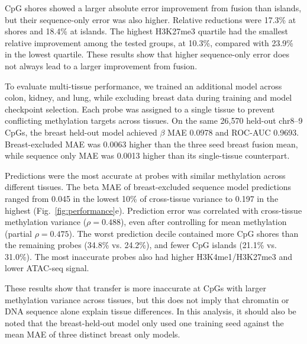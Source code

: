\documentclass[11pt,letterpaper]{article}
\begin{document}
CpG shores showed a larger absolute error improvement from fusion than islands, but their sequence-only error was also higher. Relative reductions were 17.3\% at shores and 18.4\% at islands. The highest H3K27me3 quartile had the smallest relative improvement among the tested groups, at 10.3\%, compared with 23.9\% in the lowest quartile. These results show that higher sequence-only error does not always lead to a larger improvement from fusion. 

To evaluate multi-tissue performance, we trained an additional model across colon, kidney, and lung, while excluding breast data during training and model checkpoint selection. Each probe was assigned to a single tissue to prevent conflicting methylation targets across tissues. On the same 26,570 held-out chr8--9 CpGs, the breast held-out model achieved $\beta$ MAE 0.0978 and ROC-AUC 0.9693. Breast-excluded MAE was 0.0063 higher than the three seed breast fusion mean, while sequence only MAE was 0.0013 higher than its single-tissue counterpart. 

Predictions were the most accurate at probes with similar methylation across different tissues. The beta MAE of breast-excluded sequence model predictions ranged from 0.045 in the lowest 10\% of cross-tissue variance to 0.197 in the highest (Fig.~\ref{fig:performance}e). Prediction error was correlated with cross-tissue methylation variance ($\rho=0.488$), even after controlling for mean methylation (partial $\rho=0.475$). The worst prediction decile contained more CpG shores than the remaining probes (34.8\% vs. 24.2\%), and fewer CpG islands (21.1\% vs. 31.0\%). The most inaccurate probes also had higher H3K4me1/H3K27me3 and lower ATAC-seq signal.

These results show that transfer is more inaccurate at CpGs with larger methylation variance across tissues, but this does not imply that chromatin or DNA sequence alone explain tissue differences. In this analysis, it should also be noted that the breast-held-out model only used one training seed against the mean MAE of three distinct breast only models. 
\end{document}
